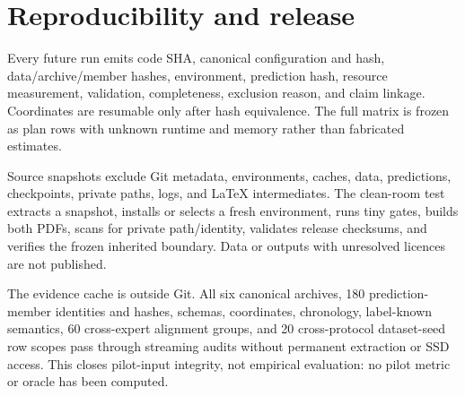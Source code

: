 \section{Reproducibility and release}



Every future run emits code SHA, canonical configuration and hash, data/archive/member hashes, environment, prediction hash, resource measurement, validation, completeness, exclusion reason, and claim linkage. Coordinates are resumable only after hash equivalence. The full matrix is frozen as plan rows with unknown runtime and memory rather than fabricated estimates.

Source snapshots exclude Git metadata, environments, caches, data, predictions, checkpoints, private paths, logs, and LaTeX intermediates. The clean-room test extracts a snapshot, installs or selects a fresh environment, runs tiny gates, builds both PDFs, scans for private path/identity, validates release checksums, and verifies the frozen inherited boundary. Data or outputs with unresolved licences are not published.

The evidence cache is outside Git. All six canonical archives, 180 prediction-member identities and hashes, schemas, coordinates, chronology, label-known semantics, 60 cross-expert alignment groups, and 20 cross-protocol dataset-seed row scopes pass through streaming audits without permanent extraction or SSD access. This closes pilot-input integrity, not empirical evaluation: no pilot metric or oracle has been computed.
